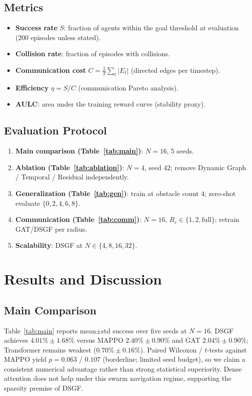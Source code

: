 \subsection{Metrics}
\begin{itemize}
  \item \textbf{Success rate} $S$: fraction of agents within the goal threshold
        at evaluation (200 episodes unless stated).
  \item \textbf{Collision rate}: fraction of episodes with collisions.
  \item \textbf{Communication cost}
        $C=\frac{1}{T}\sum_t |E_t|$ (directed edges per timestep).
  \item \textbf{Efficiency} $\eta=S/C$ (communication Pareto analysis).
  \item \textbf{AULC}: area under the training reward curve (stability proxy).
\end{itemize}

\subsection{Evaluation Protocol}
\begin{enumerate}
  \item \textbf{Main comparison (Table~\ref{tab:main})}: $N{=}16$, 5 seeds.
  \item \textbf{Ablation (Table~\ref{tab:ablation})}: $N{=}4$, seed $42$;
        remove Dynamic Graph / Temporal / Residual independently.
  \item \textbf{Generalization (Table~\ref{tab:gen})}: train at obstacle count
        $4$; zero-shot evaluate $\{0,2,4,6,8\}$.
  \item \textbf{Communication (Table~\ref{tab:comm})}: $N{=}16$,
        $R_c\in\{1,2,\mathrm{full}\}$; retrain GAT/DSGF per radius.
  \item \textbf{Scalability}: DSGF at $N\in\{4,8,16,32\}$.
\end{enumerate}


\section{Results and Discussion}
\label{sec:results}

\subsection{Main Comparison}
\label{sec:main-results}
Table~\ref{tab:main} reports mean$\pm$std success over five seeds at $N{=}16$.
DSGF achieves $4.01\%\pm1.68\%$ versus MAPPO $2.40\%\pm0.90\%$ and GAT
$2.04\%\pm0.90\%$; Transformer remains weakest ($0.70\%\pm0.16\%$).
Paired Wilcoxon / $t$-tests against MAPPO yield $p{=}0.063$ / $0.107$
(borderline; limited seed budget), so we claim a consistent numerical
advantage rather than strong statistical superiority.
Dense attention does not help under this swarm navigation regime, supporting
the sparsity premise of DSGF.

